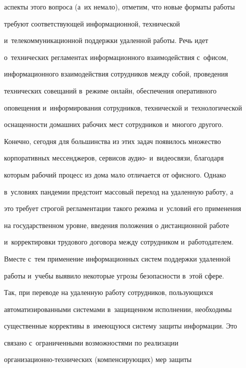 аспекты этого вопроса (а~их немало), отметим, что новые форматы работы 


требуют соответствующей информационной, технической 


и~телекоммуникационной поддержки удаленной работы. Речь идет 


о~технических регламентах информационного взаимодействия с~офисом, 


информационного взаимодействия сотрудников между собой, проведения 


технических совещаний в~режиме онлайн, обеспечения оперативного 


оповещения и~информирования сотрудников, технической и~технологической 


оснащенности домашних рабочих мест сотрудников и~многого другого. 


  


  Конечно, сегодня для большинства из этих задач появилось множество 


корпоративных мессенджеров, сервисов аудио- и~видеосвязи, благодаря 


которым рабочий процесс из дома мало отличается от офисного. Однако 


в~условиях пандемии предстоит массовый переход на удаленную работу, а 


это требует строгой регламентации такого режима и~условий его применения 


на государственном уровне, введения положения о дистанционной работе 


и~корректировки трудового договора между сотрудником и~работодателем. 


  


   Вместе с~тем применение информационных систем поддержки удаленной 


работы и~учебы выявило некоторые угрозы безопасности в~этой сфере.


   


   Так, при переводе на удаленную работу сотрудников, пользующихся 


автоматизированными системами в~защищенном исполнении, необходимы 


существенные коррективы в~имеющуюся систему защиты информации. Это 


связано с~ограниченными возможностями по реализации  


ор\-га\-ни\-за\-ци\-он\-но-тех\-ни\-че\-ских (компенсирующих) мер защиты 



